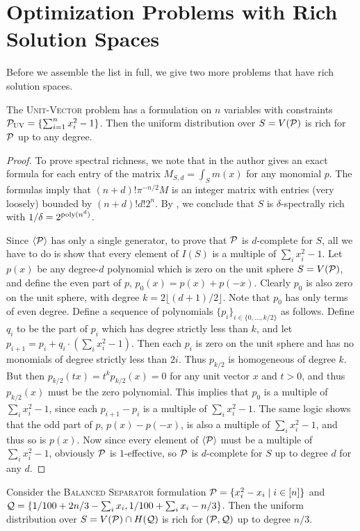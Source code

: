 \section{Optimization Problems with Rich Solution Spaces}
Before we assemble the list in full, we give two more problems that have rich solution spaces.
\begin{lemma}
The \textsc{Unit-Vector} problem has a formulation on $n$ variables with constraints $\mathcal P_{\textsc{UV}} = \{\sum_{i=1}^n x_i^2 - 1\}$. Then the uniform distribution over $S = V(\mathcal P)$ is rich for $\mathcal P$ up to any degree. 
\end{lemma}
\begin{proof}
To prove spectral richness, we note that in \cite{Foll01} the author gives an exact formula for each entry of the matrix $M_{S,d} = \int_{S} m(x)$ for any monomial $p$. The formulas imply that $(n+d)!\pi^{-n/2} M$ is an integer matrix with entries (very loosely) bounded by $(n+d)!d!2^n$. By , we conclude that $S$ is $\delta$-spectrally rich with $1/\delta = 2^{\operatorname{poly}(n^d)}$.

Since $\langle \mathcal P \rangle$ has only a single generator, to prove that $\mathcal P$ is $d$-complete for $S$, all we have to do is show that every element of $I(S)$ is a multiple of $\sum_i x_i^2 - 1$. Let $p(x)$ be any degree-$d$ polynomial which is zero on the unit sphere $S = V(\mathcal P)$, and define the even part of $p$, $p_0(x) = p(x) + p(-x)$. Clearly $p_0$ is also zero on the unit sphere, with degree $k = 2\lfloor (d+1)/2 \rfloor$. Note that $p_0$ has only terms of even degree. 
%
Define a sequence of polynomials $\{p_i\}_{i \in \{0,\ldots, k/2\}}$ as follows.
Define $q_i$ to be the part of $p_i$ which has degree strictly less than $k$, and let $p_{i+1} = p_i + q_i\cdot(\sum_i x_i^2 - 1)$. Then each $p_i$ is zero on the unit sphere and has no monomials of degree strictly less than $2i$. Thus $p_{k/2}$ is homogeneous of degree $k$. But then $p_{k/2}(tx) = t^kp_{k/2}(x) = 0$ for any unit vector $x$ and $t > 0$, and thus $p_{k/2}(x)$ must be the zero polynomial. This implies that $p_0$ is a multiple of $\sum_i x_i^2 - 1$, since each $p_{i+1} - p_i$ is a multiple of $\sum_i x_i^2 -1$. The same logic shows that the odd part of $p$, $p(x) - p(-x)$, is also a multiple of $\sum_i x_i^2 - 1$, and thus so is $p(x)$. Now since every element of $\langle \mathcal P\rangle$ must be a multiple of $\sum_i x_i^2 - 1$, obviously $\mathcal P$ is $1$-effective, so $\mathcal P$ is $d$-complete for $S$ up to degree $d$ for any $d$. 
\end{proof}
\begin{lemma}
Consider the \textsc{Balanced Separator} formulation $\mathcal P = \{x_i^2 - x_i\mid i \in [n]\}$ and $\mathcal Q = \{1/100 + 2n/3 - \sum_i x_i, 1/100 + \sum_i x_i - n/3\}$. Then the uniform distribution over $S = V(\mathcal P) \cap H(\mathcal Q)$ is rich for $(\mathcal P, \mathcal Q)$ up to degree $n/3$.
\end{lemma}
